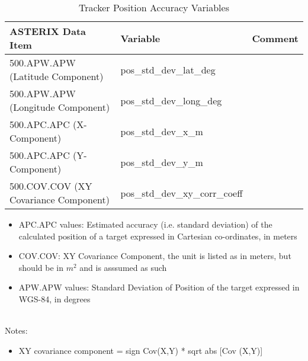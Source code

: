 \begin{center}
 \begin{table}[H]
  \begin{tabularx}{\textwidth}{ | X | l | l | }
    \hline
    \textbf{ASTERIX Data Item} & \textbf{Variable} & \textbf{Comment} \\ \hline
     500.APW.APW (Latitude Component) & pos\_std\_dev\_lat\_deg &  \\ \hline
     500.APW.APW (Longitude Component) & pos\_std\_dev\_long\_deg  &  \\ \hline
     500.APC.APC (X-Component) & pos\_std\_dev\_x\_m &  \\ \hline
     500.APC.APC (Y-Component) & pos\_std\_dev\_y\_m  &  \\ \hline
     500.COV.COV (XY Covariance Component) & pos\_std\_dev\_xy\_corr\_coeff  &  \\ \hline
\end{tabularx}
  \caption{Tracker Position Accuracy Variables}
\end{table}
\end{center}

\begin{itemize}
\item APC.APC values: Estimated accuracy (i.e. standard deviation) of the calculated position of a target expressed in Cartesian co-ordinates, in meters
\item COV.COV: XY Covariance Component, the unit is listed as in meters, but should be in $m^2$ and is asssumed as such
\item APW.APW values: Standard Deviation of Position of the target expressed in WGS-84, in degrees
\end{itemize}
\ \\

Notes:
\begin{itemize}
\item XY covariance component = sign {Cov(X,Y)} * sqrt {abs [Cov (X,Y)]}
\end{itemize}
